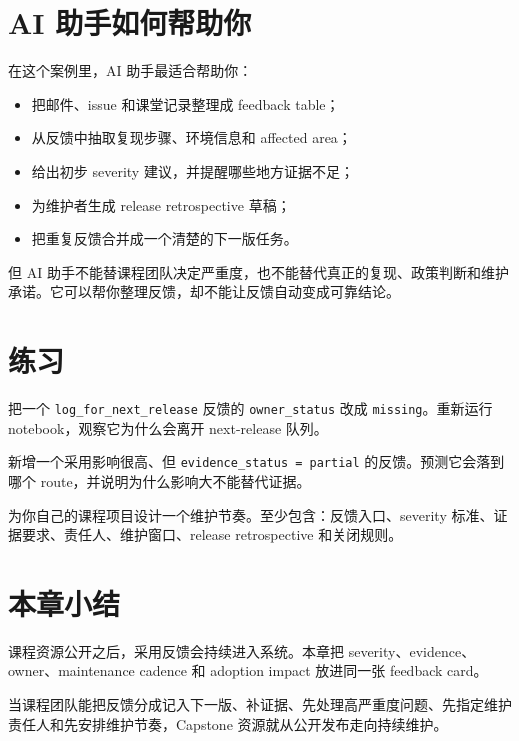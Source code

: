 \section{AI 助手如何帮助你}

在这个案例里，AI 助手最适合帮助你：

\begin{itemize}
    \item 把邮件、issue 和课堂记录整理成 feedback table；
    \item 从反馈中抽取复现步骤、环境信息和 affected area；
    \item 给出初步 severity 建议，并提醒哪些地方证据不足；
    \item 为维护者生成 release retrospective 草稿；
    \item 把重复反馈合并成一个清楚的下一版任务。
\end{itemize}

但 AI 助手不能替课程团队决定严重度，也不能替代真正的复现、政策判断和维护承诺。它可以帮你整理反馈，却不能让反馈自动变成可靠结论。

\section{练习}

\begin{exercisebox}[基础练习]
把一个 \texttt{log\_for\_next\_release} 反馈的 \texttt{owner\_status} 改成 \texttt{missing}。重新运行 notebook，观察它为什么会离开 next-release 队列。
\end{exercisebox}

\begin{exercisebox}[进阶练习]
新增一个采用影响很高、但 \texttt{evidence\_status = partial} 的反馈。预测它会落到哪个 route，并说明为什么影响大不能替代证据。
\end{exercisebox}

\begin{exercisebox}[开放练习]
为你自己的课程项目设计一个维护节奏。至少包含：反馈入口、severity 标准、证据要求、责任人、维护窗口、release retrospective 和关闭规则。
\end{exercisebox}

\section{本章小结}

课程资源公开之后，采用反馈会持续进入系统。本章把 severity、evidence、owner、maintenance cadence 和 adoption impact 放进同一张 feedback card。

当课程团队能把反馈分成记入下一版、补证据、先处理高严重度问题、先指定维护责任人和先安排维护节奏，Capstone 资源就从公开发布走向持续维护。

